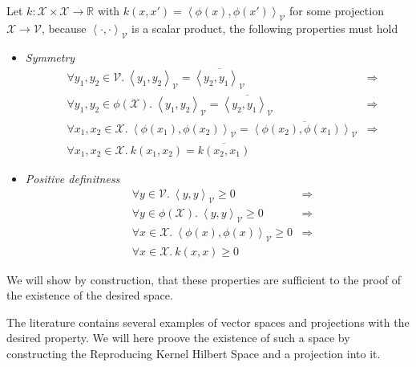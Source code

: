 Let $k :\mathcal{X} \times \mathcal{X} \rightarrow \mathbb{R}$ with $k(x, x') = \left<\phi(x), \phi(x')\right>_{\mathcal{V}}$ for some projection $\mathcal{X} \rightarrow \mathcal{V}$, because $\left<\cdot, \cdot\right>_{\mathcal{V}}$ is a scalar product, the following properties must hold

\begin{itemize}
\item \textit{Symmetry}
  \begin{equation*}
    \begin{aligned}
      & \forall y_1, y_2 \in \mathcal{V}.\ 
      \left<y_1, y_2\right>_{\mathcal{V}} = \overline{\left<y_2, y_1\right>_{\mathcal{V}}} & \Rightarrow\\
      & \forall y_1, y_2 \in \phi(\mathcal{X}).\ 
      \left<y_1, y_2\right>_{\mathcal{V}} = \overline{\left<y_2, y_1\right>_{\mathcal{V}}} & \Rightarrow\\
      &\forall x_1, x_2 \in \mathcal{X}.\ 
      \left<\phi(x_1), \phi(x_2)\right>_{\mathcal{V}} = \overline{\left<\phi(x_2), \phi(x_1)\right>_{\mathcal{V}}} &\Rightarrow\\
      &\forall x_1, x_2 \in \mathcal{X}.\ 
         k\left(x_1, x_2\right) = \overline{k\left(x_2, x_1\right)}
    \end{aligned}
  \end{equation*}

\item \textit{Positive definitness}
  \begin{equation*}
    \begin{aligned}
      & \forall y \in \mathcal{V}.\ 
        \left<y, y\right>_{\mathcal{V}} \geq 0 & \Rightarrow\\
      & \forall y \in \phi(\mathcal{X}).\ 
        \left<y, y\right>_{\mathcal{V}} \geq 0 & \Rightarrow\\
      &\forall x \in \mathcal{X}.\ 
        \left<\phi(x), \phi(x)\right>_{\mathcal{V}} \geq 0 & \Rightarrow\\
      &\forall x \in \mathcal{X}.\ 
        k\left(x, x\right) \geq 0
    \end{aligned}
  \end{equation*}
\end{itemize}

We will show by construction, that these properties are sufficient to the proof of the existence of the desired space.  

The literature contains several examples of vector spaces and projections with the desired property. We will here proove the existence of such a space by constructing the Reproducing Kernel Hilbert Space and a projection into it.



